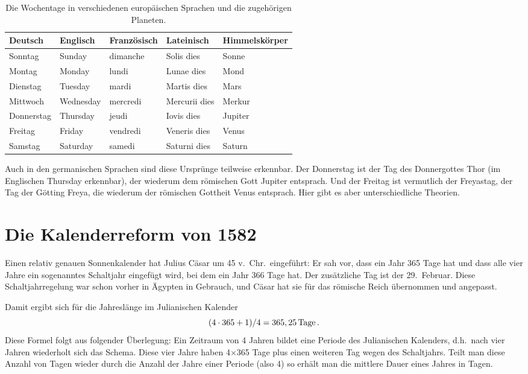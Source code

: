 \begin{table}[htb]
\begin{tabular}{l|l|l|l|l}
Deutsch      &  Englisch      & Franz\"osisch & Lateinisch & Himmelsk\"orper   \\ \hline
Sonntag      &  Sunday       &  dimanche  & Solis dies &  Sonne      \\
Montag       &  Monday       &  lundi         & Lunae dies &  Mond       \\
Dienstag     &  Tuesday      &  mardi        & Martis dies &  Mars      \\
Mittwoch     &  Wednesday &  mercredi    & Mercurii dies &  Merkur    \\
Donnerstag &  Thursday     &  jeudi         & Iovis dies & Jupiter    \\
Freitag        &  Friday          &  vendredi   & Veneris dies  & Venus  \\
Samstag     &  Saturday     &  samedi   & Saturni dies  &  Saturn   \\
\end{tabular}
\caption{\label{tab_Wochentage}%
Die Wochentage in verschiedenen europ\"aischen Sprachen und die zugeh\"origen Planeten.}
\end{table}

Auch in den germanischen Sprachen sind diese Urspr\"unge teilweise erkennbar.
Der Donnerstag ist der Tag des Donnergottes Thor (im Englischen Thursday erkennbar),
der wiederum dem r\"omischen Gott Jupiter entsprach. Und der Freitag ist vermutlich
der Freyastag, der Tag der G\"otting Freya, die wiederum der r\"omischen Gottheit
Venus entsprach. Hier gibt es aber unterschiedliche Theorien.

\section{Die Kalenderreform von 1582}
\label{sec_Kalender1582}

Einen relativ genauen 
Sonnenkalender hat Julius C\"asar um 45 v.\ Chr.\ eingef\"uhrt:
Er sah vor, dass ein Jahr 365 Tage hat und dass alle vier Jahre ein sogenanntes Schaltjahr
eingef\"ugt wird, bei dem ein Jahr 366 Tage hat. Der zus\"atzliche Tag ist der 29.\ Februar.
Diese Schaltjahrregelung war schon vorher in \"Agypten in Gebrauch, und C\"asar hat sie
f\"ur das r\"omische Reich \"ubernommen und angepasst.

Damit ergibt sich f\"ur die Jahresl\"ange im Julianischen Kalender
\begin{equation}
          (4 \cdot 365 + 1)/4 = 365,25  \,  {\rm Tage}\, .
\end{equation}
Diese Formel folgt aus folgender \"Uberlegung: Ein Zeitraum von 4 Jahren bildet eine
Periode des Julianischen Kalenders, d.h.\ nach vier Jahren wiederholt sich das Schema.
Diese vier Jahre haben 4$\times$365 Tage plus einen weiteren Tag wegen des Schaltjahrs.
Teilt man diese Anzahl von Tagen wieder durch die Anzahl der Jahre einer Periode (also 4)
so erh\"alt man die mittlere Dauer eines Jahres in Tagen.

